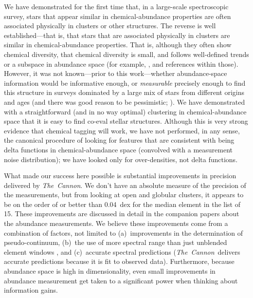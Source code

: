 \documentclass[manuscript, letterpaper]{aastex6}
\newcommand{\project}[1]{\textsl{#1}}
\newcommand{\thecannon}{\project{The~Cannon}}
\begin{document}
We have demonstrated for the first time that, in a large-scale
spectroscopic survey, stars that appear similar in
chemical-abundance properties are often associated physically in
clusters or other structures.
The reverse is well established---that is, that stars that are
associated physically in clusters are similar in chemical-abundance
properties.
That is, although they often show chemical diversity, that chemical
diversity is small, and follows well-defined trends or a subspace in
abundance space (for example, \citealt{gratton, meszaros, bovy},
and references within those).
However, it was not known---prior to this work---whether abundance-space information would be
informative enough, or \emph{measurable} precisely enough to find this
structure in surveys dominated by a large mix of stars from different
origins and ages (and there was good reason to be pessimistic;
\citealt{ting}).
We have demonstrated with a straightforward (and in no way optimal)
clustering in chemical-abundance space that it is easy to find co-eval
stellar structures.
Although this is very strong evidence that chemical tagging will work,
we have not performed, in any sense, the canonical procedure of
looking for features that are consistent with being delta functions in
chemical-abundance space (convolved with a measurement noise
distribution); we have looked only for over-densities, not delta
functions.

What made our success here possible is substantial improvements in precision
delivered by \thecannon.
We don't have an absolute measure of the precision of the measurements,
but from looking at open and globular clusters, it appears to be on the
order of or better than 0.04~dex for the median element in the list of 15.
These improvements are discussed in detail in the companion papers
\citep{casey16, ness16} about the abundance measurements.
We believe these improvements come from a combination of factors, not
limited to (a)~improvements in the determination of pseudo-continuum,
(b)~the use of more spectral range than just unblended element windows
\citep{aspcap}, and (c)~accurate spectral predictions
(\thecannon\ delivers accurate predictions because it is fit to
observed data). 
Furthermore, because abundance space is high in dimensionality, even
small improvements in abundance measurement get taken to a significant
power when thinking about information gains.
\end{document}
